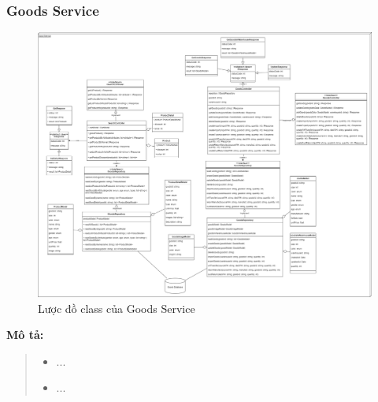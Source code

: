 \subsubsection{Goods Service}
\begin{figure}[!htp]
	\centering
	\includegraphics[width=17cm]{img/Architecture/service/GoodsService.png}
	\newline
	\caption{Lược đồ class của Goods Service}
\end{figure}
\textbf{Mô tả:}
\begin{quote}
	\begin{itemize}
		\item ...
		\item ...
	\end{itemize}
\end{quote}


